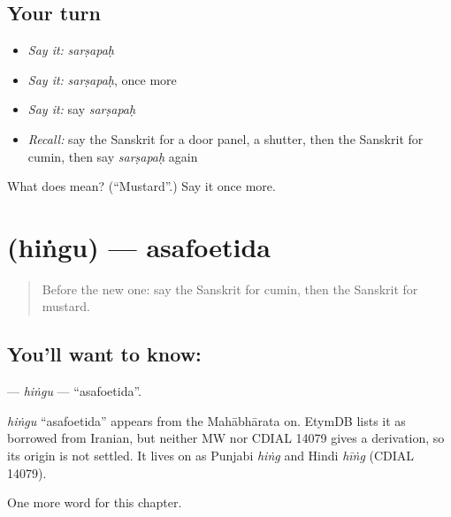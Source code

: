 \subsection*{Your turn}
\begin{itemize}
\raggedright
  \item \emph{Say it:} \emph{sarṣapaḥ}
  \item \emph{Say it:} \emph{sarṣapaḥ}, once more
  \item \emph{Say it:} say \emph{sarṣapaḥ}
  \item \emph{Recall:} say the Sanskrit for a door panel, a shutter, then the Sanskrit for cumin, then say \emph{sarṣapaḥ} again
\end{itemize}

\begin{tcolorbox}[breakable,colback=teal!4,colframe=teal!35!black,title={Before you move on}]
What does  mean? (\textquotedblleft{}Mustard\textquotedblright{}.) Say it once more.
\end{tcolorbox}
\section[\texorpdfstring{\sk{हिंगु} (hiṅgu)}{हिंगु (hiṅgu)}]{ (hiṅgu) — asafoetida}

\label{lesson:SA-C159-hingu}



\begin{quote}
Before the new one: say the Sanskrit for cumin, then the Sanskrit for mustard.
\end{quote}

\subsection*{You'll want to know: }
\textbf{} — \emph{hiṅgu} — \textquotedblleft{}asafoetida\textquotedblright{}.

\begin{cousinweb}
\emph{hiṅgu} \textquotedblleft{}asafoetida\textquotedblright{} appears from the Mahābhārata on. EtymDB lists it as borrowed from Iranian, but neither MW nor CDIAL 14079 gives a derivation, so its origin is not settled. It lives on as Punjabi \emph{hiṅg} and Hindi \emph{hīṅg} (CDIAL 14079).
\end{cousinweb}

\begin{grammarlens}[title={What you've built}]
One more word for this chapter.
\end{grammarlens}

